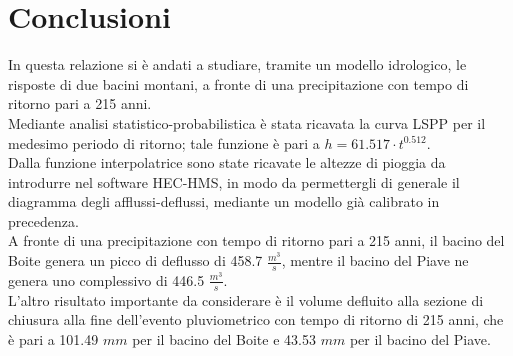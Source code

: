\section{Conclusioni}
In questa relazione si è andati a studiare, tramite un modello idrologico, le risposte di due bacini montani, a fronte di una precipitazione con tempo di ritorno pari a 215 anni.\\
Mediante analisi statistico-probabilistica è stata ricavata la curva LSPP per il medesimo periodo di ritorno; tale funzione è pari a $h=61.517 \cdot t ^{0.512}$.\\
Dalla funzione interpolatrice sono state ricavate le altezze di pioggia da introdurre nel software HEC-HMS, in modo da permettergli di generale il diagramma degli afflussi-deflussi, mediante un modello già calibrato in precedenza.\\
A fronte di una precipitazione con tempo di ritorno pari a 215 anni, il bacino del Boite genera un picco di deflusso di 458.7 $\frac{m^3}{s}$, mentre il bacino del Piave ne genera uno complessivo di 446.5 $\frac{m^3}{s}$.\\
L'altro risultato importante da considerare è il volume defluito alla sezione di chiusura alla fine dell'evento pluviometrico con tempo di ritorno di 215 anni, che è pari a 101.49 $mm$ per il bacino del Boite e 43.53 $mm$ per il bacino del Piave.
